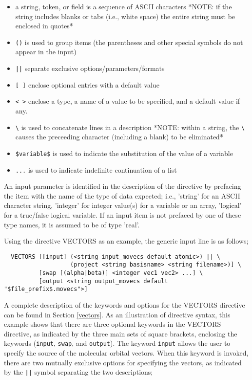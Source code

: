 \begin{itemize}
\item a string, token, or field is a sequence of ASCII characters *NOTE: if 
the string includes blanks or tabs (i.e., white space) the entire string must
be enclosed in quotes*
\item \verb+()+ is used to group items (the parentheses and other
      special symbols do not appear in the input)
\item \verb+||+ separate exclusive options/parameters/formats
\item \verb+[ ]+ enclose optional entries with a default value
\item \verb+< >+ enclose a type, a name of a value to be specified,
      and a default value if any.

\item \verb+\+ is used to concatenate lines in a description *NOTE: within 
a string, the \verb+\+ causes the preceeding character (including a blank) 
to be eliminated* 
\item \verb+$variable$+ is used to indicate the substitution of the value of a
      variable
\item \verb+...+ is used to indicate indefinite continuation of a list
\end{itemize}

An input parameter is identified in the description of the
directive by prefacing the item with the name of the type of data expected;
i.e., 'string' for an ASCII character string, 'integer' for integer
value(s) for a variable or an array, 'logical' for a true/false logical
variable.  If an input item is not prefaced by one of these type names,
it is assumed to be of type 'real'.
 
Using the directive VECTORS  as an example, 
the generic input line is as follows;
\begin{verbatim}
  VECTORS [[input] (<string input_movecs default atomic>) || \
                   (project <string basisname> <string filename>)] \
          [swap [(alpha|beta)] <integer vec1 vec2> ...] \
          [output <string output_movecs default "$file_prefix$.movecs">]
\end{verbatim}

A complete description of the keywords
and options for the VECTORS directive can be found in Section \ref{vectors}.
As an illustration of directive syntax, this example shows that there are 
three optional keywords in the VECTORS directive, as indicated by
the three main sets of square brackets, enclosing the keywords (\verb+input+,
\verb+swap+, and \verb+output+).  The keyword \verb+input+ allows the user
to specify the source of the molecular orbital vectors.  When this keyword
is invoked, there are two mutually exclusive options for specifying the
vectors, as indicated by the \verb+||+ symbol separating the two descriptions;

